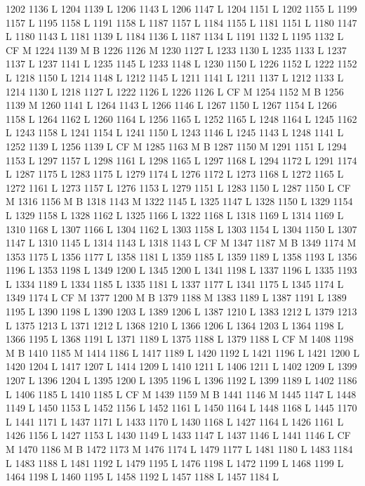 {{{{{{{{{{{{{{{{{{{{{{{{{{{{{{1202 1136 L
1204 1139 L
1206 1143 L
1206 1147 L
1204 1151 L
1202 1155 L
1199 1157 L
1195 1158 L
1191 1158 L
1187 1157 L
1184 1155 L
1181 1151 L
1180 1147 L
1180 1143 L
1181 1139 L
1184 1136 L
1187 1134 L
1191 1132 L
1195 1132 L
CF M
1224 1139 M B
1226 1126 M 1230 1127 L
1233 1130 L
1235 1133 L
1237 1137 L
1237 1141 L
1235 1145 L
1233 1148 L
1230 1150 L
1226 1152 L
1222 1152 L
1218 1150 L
1214 1148 L
1212 1145 L
1211 1141 L
1211 1137 L
1212 1133 L
1214 1130 L
1218 1127 L
1222 1126 L
1226 1126 L
CF M
1254 1152 M B
1256 1139 M 1260 1141 L
1264 1143 L
1266 1146 L
1267 1150 L
1267 1154 L
1266 1158 L
1264 1162 L
1260 1164 L
1256 1165 L
1252 1165 L
1248 1164 L
1245 1162 L
1243 1158 L
1241 1154 L
1241 1150 L
1243 1146 L
1245 1143 L
1248 1141 L
1252 1139 L
1256 1139 L
CF M
1285 1163 M B
1287 1150 M 1291 1151 L
1294 1153 L
1297 1157 L
1298 1161 L
1298 1165 L
1297 1168 L
1294 1172 L
1291 1174 L
1287 1175 L
1283 1175 L
1279 1174 L
1276 1172 L
1273 1168 L
1272 1165 L
1272 1161 L
1273 1157 L
1276 1153 L
1279 1151 L
1283 1150 L
1287 1150 L
CF M
1316 1156 M B
1318 1143 M 1322 1145 L
1325 1147 L
1328 1150 L
1329 1154 L
1329 1158 L
1328 1162 L
1325 1166 L
1322 1168 L
1318 1169 L
1314 1169 L
1310 1168 L
1307 1166 L
1304 1162 L
1303 1158 L
1303 1154 L
1304 1150 L
1307 1147 L
1310 1145 L
1314 1143 L
1318 1143 L
CF M
1347 1187 M B
1349 1174 M 1353 1175 L
1356 1177 L
1358 1181 L
1359 1185 L
1359 1189 L
1358 1193 L
1356 1196 L
1353 1198 L
1349 1200 L
1345 1200 L
1341 1198 L
1337 1196 L
1335 1193 L
1334 1189 L
1334 1185 L
1335 1181 L
1337 1177 L
1341 1175 L
1345 1174 L
1349 1174 L
CF M
1377 1200 M B
1379 1188 M 1383 1189 L
1387 1191 L
1389 1195 L
1390 1198 L
1390 1203 L
1389 1206 L
1387 1210 L
1383 1212 L
1379 1213 L
1375 1213 L
1371 1212 L
1368 1210 L
1366 1206 L
1364 1203 L
1364 1198 L
1366 1195 L
1368 1191 L
1371 1189 L
1375 1188 L
1379 1188 L
CF M
1408 1198 M B
1410 1185 M 1414 1186 L
1417 1189 L
1420 1192 L
1421 1196 L
1421 1200 L
1420 1204 L
1417 1207 L
1414 1209 L
1410 1211 L
1406 1211 L
1402 1209 L
1399 1207 L
1396 1204 L
1395 1200 L
1395 1196 L
1396 1192 L
1399 1189 L
1402 1186 L
1406 1185 L
1410 1185 L
CF M
1439 1159 M B
1441 1146 M 1445 1147 L
1448 1149 L
1450 1153 L
1452 1156 L
1452 1161 L
1450 1164 L
1448 1168 L
1445 1170 L
1441 1171 L
1437 1171 L
1433 1170 L
1430 1168 L
1427 1164 L
1426 1161 L
1426 1156 L
1427 1153 L
1430 1149 L
1433 1147 L
1437 1146 L
1441 1146 L
CF M
1470 1186 M B
1472 1173 M 1476 1174 L
1479 1177 L
1481 1180 L
1483 1184 L
1483 1188 L
1481 1192 L
1479 1195 L
1476 1198 L
1472 1199 L
1468 1199 L
1464 1198 L
1460 1195 L
1458 1192 L
1457 1188 L
1457 1184 L
}}}}}}}}}}}}}}}}}}}}}}}}}}}}}}
